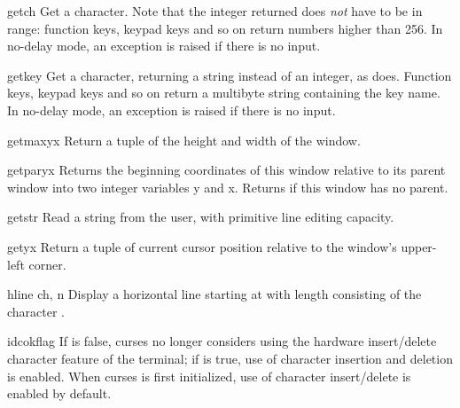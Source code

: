 \begin{methoddesc}{getch}{}
Get a character. Note that the integer returned does \emph{not} have to
be in \ASCII{} range: function keys, keypad keys and so on return numbers
higher than 256. In no-delay mode, an exception is raised if there is 
no input.
\end{methoddesc}

\begin{methoddesc}{getkey}{}
Get a character, returning a string instead of an integer, as
 does. Function keys, keypad keys and so on return a
multibyte string containing the key name.  In no-delay mode, an
exception is raised if there is no input.
\end{methoddesc}

\begin{methoddesc}{getmaxyx}{}
Return a tuple  of the height and width of
the window.
\end{methoddesc}

\begin{methoddesc}{getparyx}{}
Returns the beginning coordinates of this window relative to its
parent window into two integer variables y and x.  Returns
 if this window has no parent.
\end{methoddesc}

\begin{methoddesc}{getstr}{}
Read a string from the user, with primitive line editing capacity.
\end{methoddesc}

\begin{methoddesc}{getyx}{}
Return a tuple  of current cursor position 
relative to the window's upper-left corner.
\end{methoddesc}

\begin{methoddesc}{hline}{ ch, n}
Display a horizontal line starting at  with
length  consisting of the character .
\end{methoddesc}

\begin{methoddesc}{idcok}{flag}
If  is false, curses no longer considers using the hardware
insert/delete character feature of the terminal; if  is
true, use of character insertion and deletion is enabled.  When curses
is first initialized, use of character insert/delete is enabled by
default.
\end{methoddesc}

